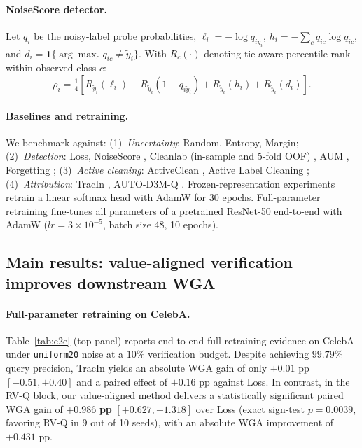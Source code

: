 \documentclass{article}
\begin{document}
\paragraph{NoiseScore detector.}
Let $q_i$ be the noisy-label probe probabilities, $\ell_i = -\log q_{i\tilde y_i}$, $h_i = -\sum_c q_{ic} \log q_{ic}$, and $d_i = \mathbf 1\{\arg\max_c q_{ic} \ne \tilde y_i\}$. With $R_c(\cdot)$ denoting tie-aware percentile rank within observed class $c$:
\begin{equation}
  \rho_i = \tfrac14 \left[ R_{\tilde y_i}(\ell_i) + R_{\tilde y_i}(1 - q_{i\tilde y_i}) + R_{\tilde y_i}(h_i) + R_{\tilde y_i}(d_i) \right].
  \label{eq:noisescore}
\end{equation}

\paragraph{Baselines and retraining.}
We benchmark against: (1)~\emph{Uncertainty}: Random, Entropy, Margin; (2)~\emph{Detection}: Loss, NoiseScore \citep{wei2022noisy}, Cleanlab (in-sample and 5-fold OOF) \citep{northcutt2021confident}, AUM \citep{pleiss2020aum}, Forgetting \citep{toneva2019forgetting}; (3)~\emph{Active cleaning}: ActiveClean \citep{krishnan2016activeclean}, Active Label Cleaning \citep{bernhardt2022active}; (4)~\emph{Attribution}: TracIn \citep{pruthi2020tracin}, AUTO-D3M-Q \citep{jain2024improving}. Frozen-representation experiments retrain a linear softmax head with AdamW for 30 epochs. Full-parameter retraining fine-tunes all parameters of a pretrained ResNet-50 end-to-end with AdamW ($lr=3\times 10^{-5}$, batch size 48, 10 epochs).

\subsection{Main results: value-aligned verification improves downstream WGA}
\label{sec:main_results}

\paragraph{Full-parameter retraining on CelebA.}
Table~\ref{tab:e2e} (top panel) reports end-to-end full-retraining evidence on CelebA under \texttt{uniform20} noise at a $10\%$ verification budget. Despite achieving $99.79\%$ query precision, TracIn yields an absolute WGA gain of only $+0.01$ pp $[-0.51, +0.40]$ and a paired effect of $+0.16$ pp against Loss. In contrast, in the RV-Q block, our value-aligned method delivers a statistically significant paired WGA gain of $\mathbf{+0.986}$ \textbf{pp} $[+0.627, +1.318]$ over Loss (exact sign-test $p=0.0039$, favoring RV-Q in 9 out of 10 seeds), with an absolute WGA improvement of $+0.431$ pp.
\end{document}
